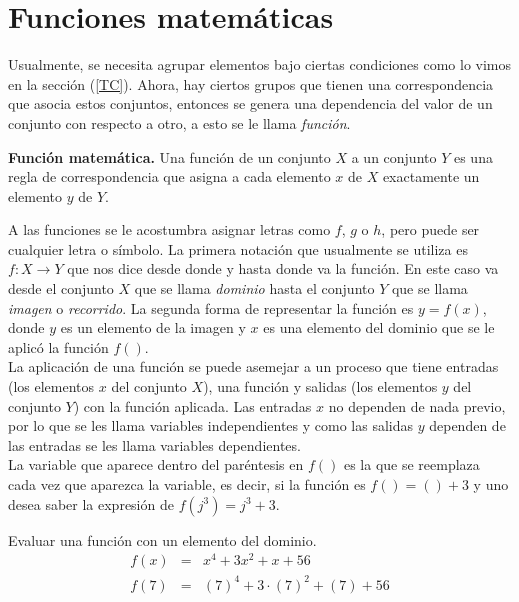 \chapter{Funciones matemáticas}
\label{FM}
Usualmente, se necesita agrupar elementos bajo ciertas condiciones como lo vimos en la sección (\ref{TC}). Ahora, hay ciertos grupos que tienen una correspondencia que asocia estos conjuntos, entonces se genera una dependencia del valor de un conjunto con respecto a otro, a esto se le llama \textit{función}. 
\begin{mydef}
\textbf{Función matemática. }Una función de un conjunto $X$ a un conjunto $Y$ es una regla de correspondencia que asigna a cada elemento $x$ de $X$ exactamente un elemento $y$ de $Y$.
\end{mydef}

A las funciones se le acostumbra asignar letras como $f$, $g$ o $h$, pero puede ser cualquier letra o símbolo. La primera notación que usualmente se utiliza es $f:X\longrightarrow Y$ que nos dice desde donde y hasta donde va la función. En este caso va desde el conjunto $X$ que se llama \textit{dominio} hasta el conjunto $Y$ que se llama \textit{imagen} o \textit{recorrido}. La segunda forma de representar la función es $y=f(x)$, donde $y$ es un elemento de la imagen y $x$ es una elemento del dominio que se le aplicó la función $f()$.\\
La aplicación de una función se puede asemejar a un proceso que tiene entradas (los elementos $x$ del conjunto $X$), una función y salidas (los elementos $y$ del conjunto $Y$) con la función aplicada. Las entradas $x$ no dependen de nada previo, por lo que se les llama variables independientes y como las salidas $y$ dependen de las entradas se les llama variables dependientes.\\

La variable que aparece dentro del paréntesis en $f()$ es la que se reemplaza cada vez que aparezca la variable, es decir, si la función es $f()=()+3$ y uno desea saber la expresión de $f(j^{3})=j^{3}+3$.\\
\begin{myexample}
Evaluar una función con un elemento del dominio.
\begin{eqnarray*}
f(x)&=&x^{4}+3x^{2}+x+56\\
f(7)&=& (7)^{4}+3\cdot (7)^{2}+(7)+56
\end{eqnarray*}
\end{myexample}

